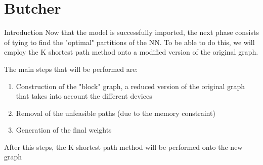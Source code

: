 \section{Butcher}

\begin{frame}[plain]{}
    \sectionpage
\end{frame}

\begin{frame}{Introduction}
    Now that the model is successfully imported, the next phase consists of tying to find the "optimal" partitions of the NN. To be able to do this, we will employ the K shortest path method onto a modified version of the original graph.
    
    The main steps that will be performed are:
    \begin{enumerate}
        \item Construction of the "block" graph, a reduced version of the original graph that takes into account the different devices
        \item Removal of the unfeasible paths (due to the memory constraint)
        \item Generation of the final weights
    \end{enumerate}
    
    After this steps, the K shortest path method will be performed onto the new graph
\end{frame}

